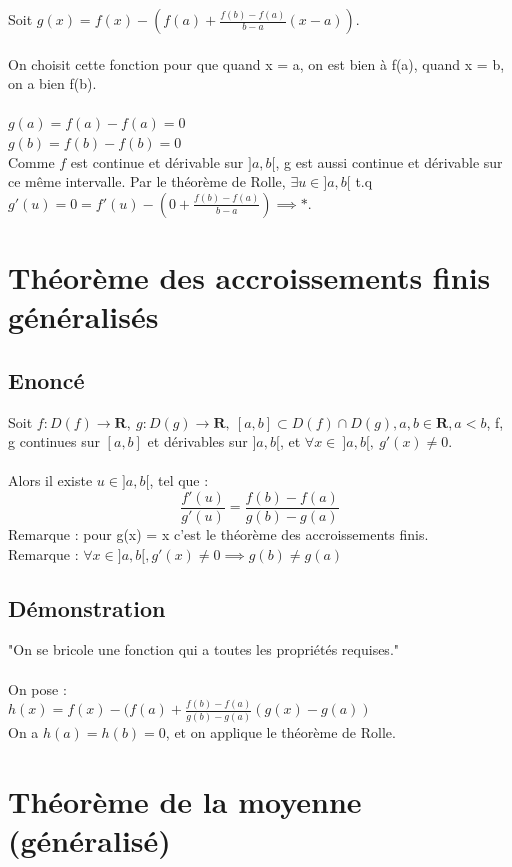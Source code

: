 \documentclass{article}
\begin{document}
Soit $ g(x) = f(x) - (f(a) + \frac{f(b) - f(a)}{b - a}(x-a))$.\\\\
On choisit cette fonction pour que quand x = a, on est bien à f(a), quand x = b, on a bien f(b).\\\\
$ g(a) = f(a) - f(a) = 0 $\\
$ g(b) = f(b) - f(b) = 0 $\\
Comme $f$ est continue et dérivable sur $ ]a, b[$, g est aussi continue et dérivable sur ce même intervalle. Par le théorème de Rolle, $ \exists u \in ]a, b[ $ t.q $ g'(u) = 0 = f'(u) - (0 + \frac{f(b) - f(a)}{b - a}) \implies *$.

\newpage

\section{Théorème des accroissements finis généralisés}

\subsection{Enoncé}

Soit $ f : D(f) \to \mathbf{R},\ g : D(g) \to \mathbf{R},\ [a,b] \subset D(f) \cap D(g), a, b \in \mathbf{R}, a < b $, f, g continues sur $ [a, b] $ et dérivables sur $]a, b[$, et $ \forall x \in\ ]a, b[,\ g'(x) \neq 0. $\\\\
Alors il existe $ u \in ]a, b[ $, tel que :
\[ \frac{f'(u)}{g'(u)} = \frac{f(b) - f(a)}{g(b) - g(a)}\]
Remarque : pour g(x) = x c'est le théorème des accroissements finis.\\
Remarque : $ \forall x \in ]a, b[, g'(x) \neq 0 \implies g(b) \neq g(a)$

\subsection{Démonstration}

"On se bricole une fonction qui a toutes les propriétés requises."\\\\
On pose :\\
$ h(x) = f(x) - (f(a) + \frac{f(b) - f(a)}{g(b) - g(a)}(g(x) - g(a)) $\\
On a $ h(a) = h(b) = 0 $, et on applique le théorème de Rolle.

\newpage

\section{Théorème de la moyenne (généralisé)}
\end{document}
